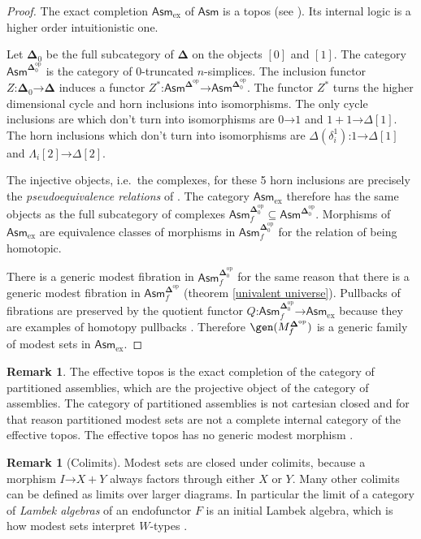 \documentclass{amsart}
\theoremstyle{plain}
\theoremstyle{definition}
\newtheorem{remark}[theorem]{Remark}
\newcommand\ri{^*}
\newcommand\dual{^{\mathrm{op}}}
\newcommand\simCat{\mathbf\Delta}
\newcommand\s{^{\simCat\dual}}
\newcommand\Asm{\mathsf{Asm}}
\newcommand\of{\mathord:}
\renewcommand\to{\mathord\rightarrow}
\newcommand\f{_f}
\begin{document}
\newcommand\ex{_{\textrm{ex}}}
\begin{proof} The exact completion $\Asm\ex$ of $\Asm$ is a topos (see \cite{MR1981211}). Its internal logic is a higher order intuitionistic one. 

Let $\simCat_0$ be the full subcategory of $\simCat$ on the objects $[0]$ and $[1]$. The category $\Asm^{\simCat_0\dual}$ is the category of $0$-truncated $n$-simplices. The inclusion functor $Z\of \simCat_0\to\simCat$ induces a functor $Z\ri\of \Asm\s \to \Asm^{\simCat_0\dual}$. The functor $Z\ri$ turns the higher dimensional cycle and horn inclusions into isomorphisms. The only cycle inclusions are which don't turn into isomorphisms are $0\to 1$ and $1+1 \to \Delta[1]$. The horn inclusions which don't turn into isomorphisms are $\Delta(\delta^1_i)\of 1\to \Delta[1]$ and $\Lambda_i[2] \to \Delta[2]$.

The injective objects, i.e.\ the complexes, for these 5 horn inclusions are precisely the \emph{pseudoequivalence relations} of \cite{MR1600009}. The category $\Asm\ex$ therefore has the same objects as the full subcategory of complexes $\Asm^{\simCat_0\dual}\f\subseteq \Asm^{\simCat_0\dual}$. Morphisms of $\Asm\ex$ are equivalence classes of morphisms in $\Asm^{\simCat_0\dual}\f$ for the relation of being homotopic. 

There is a generic modest fibration in $\Asm^{\simCat_0\dual}\f$ for the same reason that there is a generic modest fibration in $\Asm\s\f$ (theorem \ref{univalent universe}). Pullbacks of fibrations are preserved by the quotient functor $Q\of \Asm^{\simCat_0\dual}\f \to\Asm\ex$ because they are examples of homotopy pullbacks \cite{GJSHT}. Therefore $\gen(M\s\f)$ is a generic family of modest sets in $\Asm\ex$.
\end{proof}

\begin{remark} The effective topos is the exact completion of the category of partitioned assemblies, which are the projective object of the category of assemblies. The category of partitioned assemblies is not cartesian closed and for that reason partitioned modest sets are not a complete internal category of the effective topos. The effective topos has no generic modest morphism \cite{MR1023803}.
\end{remark}


\begin{remark}[Colimits] Modest sets are closed under colimits, because a morphism $I\to X+Y$ always factors through either $X$ or $Y$. Many other colimits can be defined as limits over larger diagrams. In particular the limit of a category of \emph{Lambek algebras} of an endofunctor $F$ is an initial Lambek algebra, which is how modest sets interpret $W$-types \cite{Freyd91}.
\end{remark}
\end{document}
